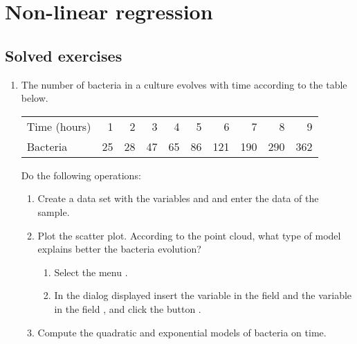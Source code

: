 
\chapter{Non-linear regression}\label{cha:non-linear-regression}

\section{Solved exercises}
\begin{enumerate}[leftmargin=*]
\item The number of bacteria in a culture evolves with time according to the table below.

\begin{center}
\begin{tabular}{lrrrrrrrrr}
\hline
Time (hours) & 1 & 2 & 3 & 4 & 5 & 6 & 7 & 8 & 9 \\
Bacteria & 25 & 28 & 47 & 65 & 86 & 121 & 190 & 290 & 362\\
\hline
\end{tabular}
\end{center}

Do the following operations:
\begin{enumerate}
\item Create a data set with the variables  and  and enter the data of the sample.

\item Plot the scatter plot. 
According to the point cloud, what type of model explains better the bacteria evolution?
\begin{indication}
\begin{enumerate}
\item Select the menu .
\item In the dialog displayed insert the variable  in the field 
and the variable  in the field , and click the button .
\end{enumerate}
\end{indication}

\item Compute the quadratic and exponential models of bacteria on time.


\end{enumerate}
\end{enumerate}
